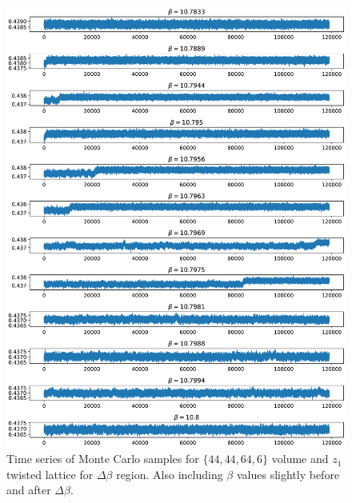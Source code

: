 \documentclass[english,twoside,openright]{UH_TCM_MSc}
\begin{document}
\begin{figure}[!htb]
    \centering
    \includegraphics[width=\textwidth]{final_plots/misc/twist_1_autocorrelation.pdf}
    \caption{Time series of Monte Carlo samples for $\{44,44,64,6\}$ volume and $z_1$ twisted lattice for $\Delta \beta$ region. Also including $\beta$ values slightly before and after $\Delta \beta$.}
    \label{fig:twist_time_series_1}
\end{figure}
\end{document}
